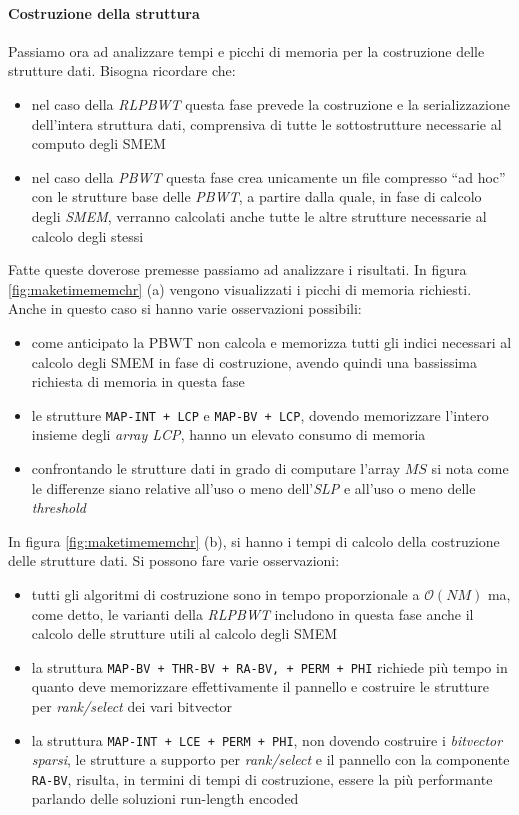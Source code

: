 \paragraph{Costruzione della struttura}
Passiamo ora ad analizzare tempi e picchi di memoria per la costruzione delle
strutture dati. Bisogna ricordare che:
\begin{itemize}
  \item nel caso della \textit{RLPBWT} questa fase prevede la costruzione e la
  serializzazione dell'intera struttura dati, comprensiva di tutte le
  sottostrutture necessarie al computo degli SMEM
  \item nel caso della \textit{PBWT} questa fase crea unicamente un file
  compresso ``ad hoc'' con le strutture base delle \textit{PBWT}, a partire
  dalla quale, in fase di calcolo degli \textit{SMEM}, verranno calcolati anche
  tutte le altre strutture necessarie al calcolo degli stessi
\end{itemize}
Fatte queste doverose premesse passiamo ad analizzare i risultati.
In figura \ref{fig:maketimememchr} (a) vengono visualizzati i picchi di
memoria 
richiesti. Anche in questo caso si hanno varie osservazioni possibili:
\begin{itemize}
  \item come anticipato la PBWT non calcola e memorizza tutti gli indici
  necessari al calcolo degli SMEM in fase di costruzione, avendo quindi una
  bassissima richiesta di memoria in questa fase
  \item le strutture \texttt{MAP-INT + LCP} e \texttt{MAP-BV + LCP}, dovendo
  memorizzare l'intero insieme degli \textit{array LCP}, hanno un elevato
  consumo di memoria
  \item confrontando le strutture dati in grado di computare l'array $MS$ si
  nota come le differenze siano relative all'uso o meno dell'\textit{SLP} e
  all'uso o meno delle \textit{threshold}
\end{itemize}
In figura
\ref{fig:maketimememchr} (b), si hanno i tempi di calcolo della costruzione
delle strutture dati. Si possono fare varie osservazioni:
\begin{itemize}
  \item tutti gli algoritmi di costruzione sono in tempo proporzionale a
  $\mathcal{O}(NM)$ ma, come detto, le varianti della \textit{RLPBWT} includono
  in questa fase anche il calcolo delle strutture utili al calcolo degli SMEM
  \item 
  la struttura \texttt{MAP-BV + THR-BV + RA-BV, + PERM + PHI}
  richiede più tempo in quanto deve memorizzare effettivamente il pannello e
  costruire le strutture per \textit{rank/select} dei vari bitvector
  \item la struttura \texttt{MAP-INT + LCE + PERM + PHI}, non dovendo costruire i
  \textit{bitvector sparsi}, le strutture a supporto per \textit{rank/select} e
  il pannello con la componente \texttt{RA-BV}, risulta, in termini di tempi di
  costruzione, 
  essere la più performante parlando delle soluzioni run-length encoded
\end{itemize}
